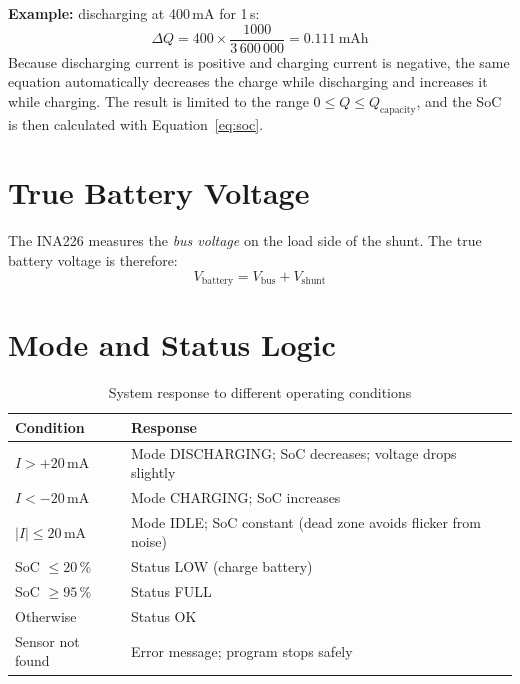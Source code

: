 \documentclass[12pt,a4paper,oneside]{report}
\begin{document}
\textbf{Example:} discharging at 400\,mA for 1\,s:
\[
\Delta Q = 400 \times \frac{1000}{3\,600\,000} = 0.111\ \text{mAh}
\]
Because discharging current is positive and charging current is negative, the same equation automatically decreases the charge while discharging and increases it while charging. The result is limited to the range $0 \le Q \le Q_{\text{capacity}}$, and the SoC is then calculated with Equation~\eqref{eq:soc}.

\section{True Battery Voltage}
The INA226 measures the \emph{bus voltage} on the load side of the shunt. The true battery voltage is therefore:
\begin{equation}
  V_{\text{battery}} = V_{\text{bus}} + V_{\text{shunt}}
\end{equation}

\section{Mode and Status Logic}
\begin{table}[H]
\centering
\caption{System response to different operating conditions}
\label{tab:modes}
\begin{tabularx}{\linewidth}{lX}
\toprule
\textbf{Condition} & \textbf{Response} \\
\midrule
$I > +20$\,mA & Mode DISCHARGING; SoC decreases; voltage drops slightly \\
$I < -20$\,mA & Mode CHARGING; SoC increases \\
$|I| \le 20$\,mA & Mode IDLE; SoC constant (dead zone avoids flicker from noise) \\
SoC $\le 20$\,\% & Status LOW (charge battery) \\
SoC $\ge 95$\,\% & Status FULL \\
Otherwise & Status OK \\
Sensor not found & Error message; program stops safely \\
\bottomrule
\end{tabularx}
\end{table}
\end{document}
